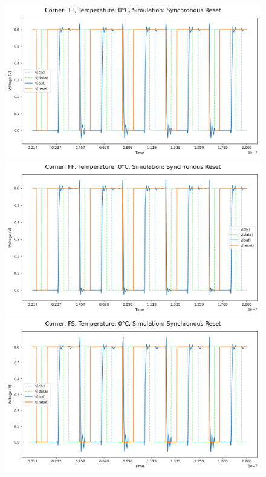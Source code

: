 \begin{figure}[H]
    \centering
    \includegraphics[height= 0.21\textheight]{figures/aimspice/TT/0/W4.csv.png}
    \vspace{5pt}
    \includegraphics[height= 0.21\textheight]{figures/aimspice/FF/0/W4.csv.png}
    \vspace{5pt}
    \includegraphics[height= 0.21\textheight]{figures/aimspice/FS/0/W4.csv.png}

\end{figure}
